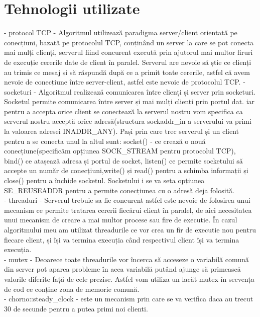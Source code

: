 \documentclass{llncs}
\begin{document}
\section{Tehnologii utilizate}
- protocol TCP - Algoritmul utilizează paradigma server/client orientată pe conecțiuni, bazată pe protocolul TCP, conținând un server la care se pot conecta mai mulți clienți, serverul fiind concurent execută prin ajutorul mai multor firuri de execuție cererile date de client în paralel. Serverul are nevoie să știe ce clienți au trimis ce mesaj și să răspundă după ce a primit toate cererile, astfel că avem nevoie de conecțiune între server-client, astfel este nevoie de protocolul TCP.
- socketuri - Algoritmul realizează comunicarea între clienți și server prin socketuri. Socketul permite comunicarea între server și mai mulți clienți prin portul dat. iar pentru a accepta orice client se conectează la serverul nostru vom specifica ca serverul nostru acceptă orice adresă(structura sockaddr\_in a serverului va primi la valoarea adresei INADDR\_ANY). Pași prin care trec serverul și un client pentru a se conecta unul la altul sunt: socket() - ce crează o nouă conecțiune(specificăm opțiunea SOCK\_STREAM pentru protocolul TCP), bind() ce atașează adresa și portul de socket, listen() ce permite socketului să accepte un număr de conecțiuni,write() și read() pentru a schimba informații și close() pentru a închide socketul. Socketului i se va seta opțiunea SE\_REUSEADDR pentru a permite conecțiunea cu o adresă deja folosită.\\
- threaduri - Serverul trebuie sa fie concurent astfel este nevoie de folosirea unui mecanism ce permite tratarea cererii fiecărui client în paralel, de aici necesitatea unui mecanism de creare a mai multor procese sau fire de executie. În cazul algoritmului meu am utilizat threadurile ce vor crea un fir de executie nou pentru fiecare client, și își va termina execuția când respectivul client își va termina execuția.\\
- mutex - Deoarece toate threadurile vor încerca să acceseze o variabilă comună din server pot aparea probleme în acea variabilă putând ajunge să primească valorile diferite față de cele prezise. Astfel vom utiliza un lacăt mutex în secvența de cod ce conține zona de memorie comună.\\
- chorno::steady\_clock - este un mecanism prin care se va verifica daca au trecut 30 de secunde pentru a putea primi noi clienti.
\end{document}
